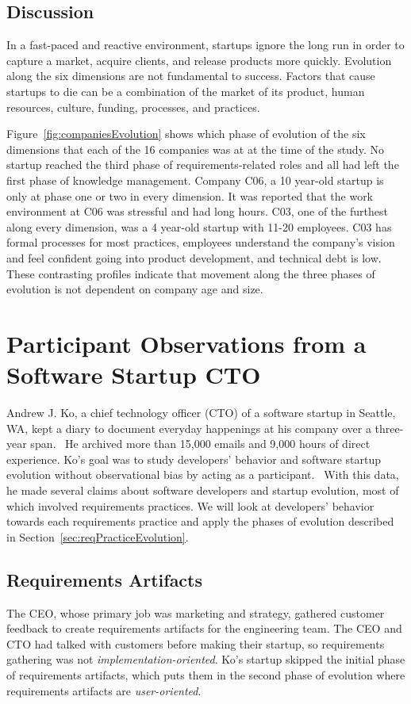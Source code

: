 \documentclass{sig-alternate}
\begin{document}
\subsection{Discussion}
\label{sec:discussion}
In a fast-paced and reactive environment, startups ignore the long run in order to capture a market, acquire clients, and release products more quickly. Evolution along the six dimensions are not fundamental to success. Factors that cause startups to die can be a combination of the market of its product, human resources, culture, funding, processes, and practices.

Figure~\ref{fig:companiesEvolution} shows which phase of evolution of the six dimensions that each of the 16 companies was at at the time of the study. No startup reached the third phase of requirements-related roles and all had left the first phase of knowledge management. Company C06, a 10 year-old startup is only at phase one or two in every dimension.  It was reported that the work environment at C06 was stressful and had long hours. C03, one of the furthest along every dimension, was a 4 year-old startup with 11-20 employees. C03 has formal processes for most practices, employees understand the company's vision and feel confident going into product development, and technical debt is low.~\cite{Gralha:2018} These contrasting profiles indicate that movement along the three phases of evolution is not dependent on company age and size. 

\section{Participant Observations from a Software Startup CTO}
\label{sec:CTOstory}
Andrew J. Ko, a chief technology officer (CTO) of a software startup in Seattle, WA, kept a diary to document everyday happenings at his company over a three-year span.~\cite{Ko:2017} He archived more than 15,000 emails and 9,000 hours of direct experience. Ko's goal was to study developers' behavior and software startup evolution without observational bias by acting as a participant.~\cite{Ko:2017} With this data, he made several claims about software developers and startup evolution, most of which involved requirements practices. We will look at developers' behavior towards each requirements practice and apply the phases of evolution described in Section~\ref{sec:reqPracticeEvolution}.

\subsection{Requirements Artifacts}
The CEO, whose primary job was marketing and strategy, gathered customer feedback to create requirements artifacts for the engineering team. The CEO and CTO had talked with customers before making their startup, so requirements gathering was not \emph{implementation-oriented}. Ko's startup skipped the initial phase of requirements artifacts, which puts them in the second phase of evolution where requirements artifacts are \emph{user-oriented}. 
\end{document}
